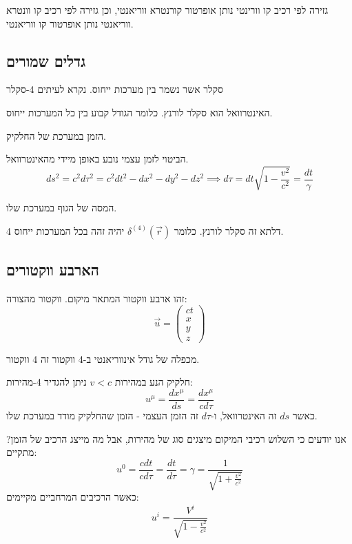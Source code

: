 \documentclass{tstextbook}
\begin{document}
\begin{proposition}
גזירה לפי רכיב קו וורינטי נותן אופרטור קורנטרא ווריאנטי, וכן גזירה לפי רכיב קו וונטרא ווריאנטי נותן אופרטור קו ווריאנטי. 

\end{proposition}
\subsection{גדלים שמורים}

\begin{definition}
סקלר אשר נשמר בין מערכות ייחוס. נקרא לעיתים 4-סקלר

\end{definition}
\begin{proposition}
האינטרוואל הוא סקלר לורנץ. כלומר הגודל קבוע בין כל המערכות ייחוס.

\end{proposition}
\begin{definition}
הזמן במערכת של החלקיק.

\end{definition}
הביטוי לזמן עצמי נובע באופן מיידי מהאינטרוואל. 
$$ds^2 =c^2d\tau^2=c^2dt^2-dx^2-dy^2-dz^2\implies d\tau=dt\sqrt{ 1-\frac{v^2}{c^2} }=\frac{dt}{\gamma}$$

\begin{definition}
המסה של הגוף במערכת שלו.

\end{definition}
\begin{proposition}
4 דלתא זה סקלר לורנץ. כלומר \(\delta^{(4)}\left( \vec{r} \right)\) יהיה זהה בכל המערכות ייחוס. 

\end{proposition}
\subsection{הארבע ווקטורים}

\begin{definition}[אירוע]
זהו ארבע ווקטור המתאר מיקום. ווקטור מהצורה:
$$\vec{u}=\begin{pmatrix}ct \\x \\y \\z
\end{pmatrix}$$

\end{definition}
\begin{proposition}
מכפלה של גודל אינווריאנטי ב-4 ווקטור זה 4 ווקטור.

\end{proposition}
\begin{definition}[4 מהירות]
חלקיק הנע במהירות \(v<c\) ניתן להגדיר 4-מהירות:
$$u^\mu = \frac{dx^\mu}{ds}=\frac{dx^\mu}{cd\tau} $$
כאשר \(ds\) זה האינטרוואל, ו-\(d\tau\) זה הזמן העצמי - הזמן שהחלקיק מודד במערכת שלו. 

\end{definition}
אנו יודעים כי השלוש רכיבי המיקום מיצגים סוג של מהירות, אבל מה מייצג הרכיב של הזמן?
מתקיים:
$$u^0=\frac{cdt}{cd\tau}=\frac{dt}{d\tau}=\gamma=\frac{1}{\sqrt{ 1+\frac{v^2}{c^2} }}$$
כאשר הרכיבים המרחביים מקיימים:
$$u^i=\frac{V^i}{\sqrt{ 1-\frac{v^2}{c^2} }}$$
\end{document}
